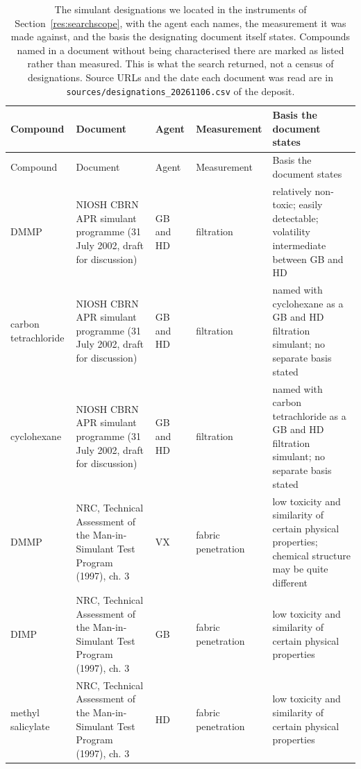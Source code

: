 \begingroup
\scriptsize
\sloppy
\setlength{\tabcolsep}{3pt}
\renewcommand{\arraystretch}{1.0}
\begin{longtable}{>{\raggedright\arraybackslash}p{2.0cm}>{\raggedright\arraybackslash}p{3.6cm}>{\raggedright\arraybackslash}p{1.6cm}>{\raggedright\arraybackslash}p{2.4cm}>{\raggedright\arraybackslash}p{4.6cm}}
\caption{The simulant designations we located in the instruments of Section~\ref{res:searchscope}, with the agent each names, the measurement it was made against, and the basis the designating document itself states. Compounds named in a document without being characterised there are marked as listed rather than measured. This is what the search returned, not a census of designations. Source URLs and the date each document was read are in \texttt{sources/designations\_20261106.csv} of the deposit.}
\label{tab:designations}\\
\hline
Compound & Document & Agent & Measurement & Basis the document states \\
\hline
\endfirsthead
\hline
Compound & Document & Agent & Measurement & Basis the document states \\
\hline
\endhead
\hline
\endfoot
DMMP & NIOSH CBRN APR simulant programme (31 July 2002, draft for discussion) & GB and HD & filtration & relatively non-toxic; easily detectable; volatility intermediate between GB and HD \\
carbon tetrachloride & NIOSH CBRN APR simulant programme (31 July 2002, draft for discussion) & GB and HD & filtration & named with cyclohexane as a GB and HD filtration simulant; no separate basis stated \\
cyclohexane & NIOSH CBRN APR simulant programme (31 July 2002, draft for discussion) & GB and HD & filtration & named with carbon tetrachloride as a GB and HD filtration simulant; no separate basis stated \\
DMMP & NRC, Technical Assessment of the Man-in-Simulant Test Program (1997), ch. 3 & VX & fabric penetration & low toxicity and similarity of certain physical properties; chemical structure may be quite different \\
DIMP & NRC, Technical Assessment of the Man-in-Simulant Test Program (1997), ch. 3 & GB & fabric penetration & low toxicity and similarity of certain physical properties \\
methyl salicylate & NRC, Technical Assessment of the Man-in-Simulant Test Program (1997), ch. 3 & HD & fabric penetration & low toxicity and similarity of certain physical properties \\

\end{longtable}
